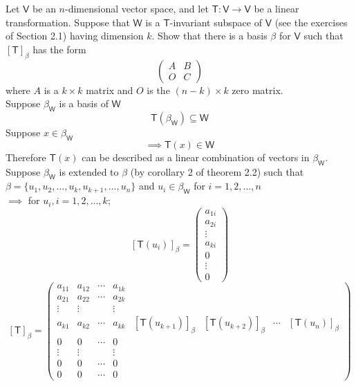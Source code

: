 Let $\mathsf{V}$ be an $n$-dimensional vector space, and let
$\mathsf{T}\colon\mathsf{V}\to\mathsf{V}$ be a linear
transformation. Suppose that $\mathsf{W}$ is a $\mathsf{T}$-invariant
subspace of $\mathsf{V}$ (see the exercises of Section 2.1) having
dimension $k$. Show that there is a basis $\beta$ for $\mathsf{V}$
such that $\left[\mathsf{T}\right]_\beta$ has the form
\[
\begin{pmatrix}
A & B\\
O & C
\end{pmatrix}
\]
where $A$ is a $k\times k$ matrix and $O$ is the $(n-k) \times k$ zero matrix.
\\Suppose $\beta_\mathsf{W}$ is a basis of $\mathsf{W}$
\begin{equation}
\mathsf{T}(\beta_\mathsf{W}) \subseteq \mathsf{W}
\end{equation}
Suppose $x\in \beta_\mathsf{W}$ 
\begin{equation}
\implies \mathsf{T}(x) \in \mathsf{W}
\end{equation}
Therefore $\mathsf{T}(x) $ can be described as a linear combination of
vectors in $\beta_\mathsf{W}$.
\\Suppose $\beta_\mathsf{W}$ is extended to $\beta$ (by corollary 2 of
theorem 2.2) such that \\$\beta =
\{u_1,u_2,\dots,u_k,u_{k+1},\dots,u_n\}$ and $u_i \in
\beta_\mathsf{W}$ for $i=1,2,\dots,n$ \\$\implies$ for $u_i,
i=1,2,\dots,k$;
\begin{equation}
\left[\mathsf{T}(u_i)\right]_\beta =
\begin{pmatrix}
a_{1i}\\a_{2i}\\\vdots\\a_{ki}\\0\\\vdots\\0
\end{pmatrix}
\end{equation}
\begin{equation}
\left[\mathsf{T}\right]_\beta = 
\begin{pmatrix}
a_{11} & a_{12} & \cdots & a_{1k} & & &  \\
a_{21} & a_{22} & \cdots & a_{2k} & & &  \\
\vdots & \vdots &  & \vdots & & & &  \\
a_{k1} & a_{k2} & \cdots & a_{kk} &
\left[\mathsf{T}(u_{k+1})\right]_\beta &
\left[\mathsf{T}(u_{k+2})\right]_\beta & \cdots &
\left[\mathsf{T}(u_n)\right]_\beta\\
0 & 0 & \cdots & 0 & & & &  \\
\vdots & \vdots &  & \vdots & & & &  \\
0 & 0 & \cdots & 0 & & & &  \\
0 & 0 & \cdots & 0 & & & &  
\end{pmatrix}
\end{equation}
